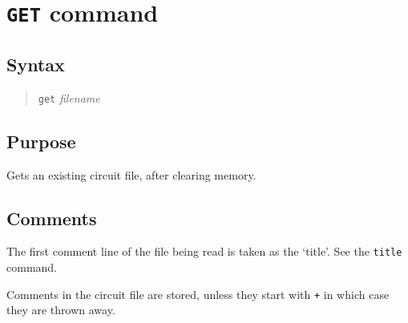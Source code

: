 %
%
%
%
\section{{\tt GET} command}
\subsection{Syntax}
\begin{verse}
{\tt get} {\it filename}
\end{verse}
\subsection{Purpose}

Gets an existing circuit file, after clearing memory.
\subsection{Comments}

The first comment line of the file being read is taken as the `title'.  See
the {\tt title} command.

Comments in the circuit file are stored, unless they start with {\tt *+} in
which case they are thrown away.

